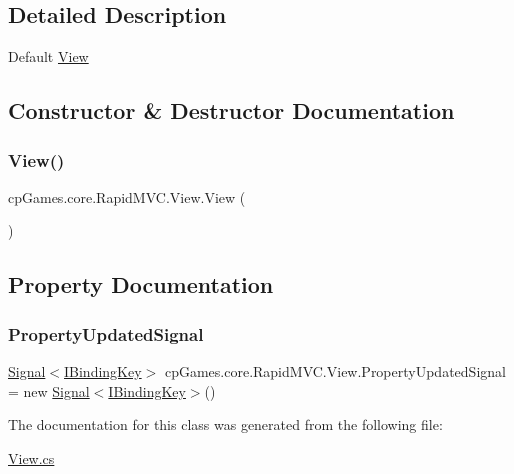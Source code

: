 \subsection{Detailed Description}
Default \mbox{\hyperlink{classcp_games_1_1core_1_1_rapid_m_v_c_1_1_view}{View}} 



\subsection{Constructor \& Destructor Documentation}
\mbox{\label{classcp_games_1_1core_1_1_rapid_m_v_c_1_1_view_a40db8f93a7952a91c90183ded2f44640}} 
\subsubsection{\texorpdfstring{View()}{View()}}
{\footnotesize\ttfamily cp\+Games.\+core.\+Rapid\+M\+V\+C.\+View.\+View (\begin{DoxyParamCaption}{ }\end{DoxyParamCaption})\hspace{0.3cm}{\ttfamily [protected]}}



\subsection{Property Documentation}
\mbox{\label{classcp_games_1_1core_1_1_rapid_m_v_c_1_1_view_ab8e01d990df4516ff4591df6277edf63}} 
\subsubsection{\texorpdfstring{PropertyUpdatedSignal}{PropertyUpdatedSignal}}
{\footnotesize\ttfamily \mbox{\hyperlink{classcp_games_1_1core_1_1_rapid_m_v_c_1_1_signal}{Signal}}$<$\mbox{\hyperlink{interfacecp_games_1_1core_1_1_rapid_m_v_c_1_1_i_binding_key}{I\+Binding\+Key}}$>$ cp\+Games.\+core.\+Rapid\+M\+V\+C.\+View.\+Property\+Updated\+Signal = new \mbox{\hyperlink{classcp_games_1_1core_1_1_rapid_m_v_c_1_1_signal}{Signal}}$<$\mbox{\hyperlink{interfacecp_games_1_1core_1_1_rapid_m_v_c_1_1_i_binding_key}{I\+Binding\+Key}}$>$()\hspace{0.3cm}{\ttfamily [get]}}



The documentation for this class was generated from the following file\+:\begin{DoxyCompactItemize}
\item 
\mbox{\hyperlink{_view_8cs}{View.\+cs}}\end{DoxyCompactItemize}
